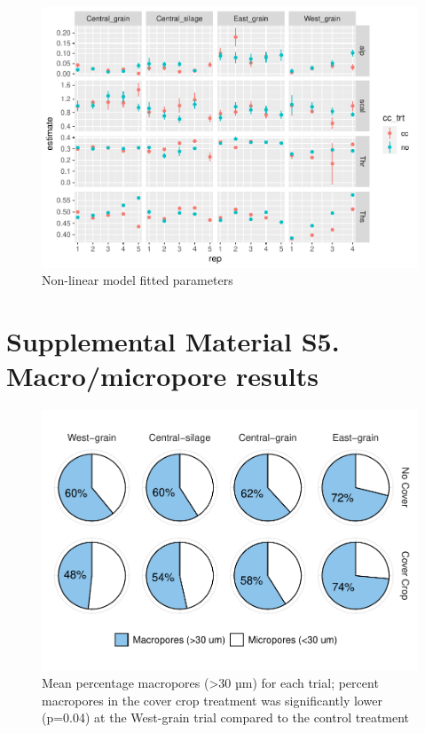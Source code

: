 \documentclass[
]{article}
\begin{document}
\begin{figure}
\centering
\includegraphics{rmd-supp-mat_files/figure-latex/paramsalp-1.pdf}
\caption{Non-linear model fitted parameters}
\end{figure}

\hypertarget{supplemental-material-s5.-macromicropore-results}{%
\section{Supplemental Material S5. Macro/micropore
results}\label{supplemental-material-s5.-macromicropore-results}}

\begin{figure}
\centering
\includegraphics{rmd-supp-mat_files/figure-latex/pores-1.pdf}
\caption{Mean percentage macropores (\textgreater30 µm) for each trial;
percent macropores in the cover crop treatment was significantly lower
(p=0.04) at the West-grain trial compared to the control treatment}
\end{figure}
\end{document}
